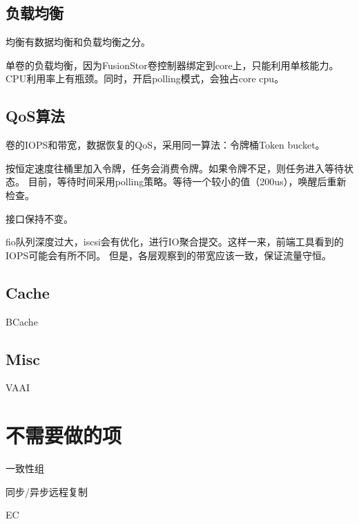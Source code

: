 \subsection{负载均衡}

均衡有数据均衡和负载均衡之分。

单卷的负载均衡，因为FusionStor卷控制器绑定到core上，只能利用单核能力。
CPU利用率上有瓶颈。同时，开启polling模式，会独占core cpu。

\subsection{QoS算法}

卷的IOPS和带宽，数据恢复的QoS，采用同一算法：令牌桶Token bucket。

按恒定速度往桶里加入令牌，任务会消费令牌。如果令牌不足，则任务进入等待状态。
目前，等待时间采用polling策略。等待一个较小的值（200us），唤醒后重新检查。

接口保持不变。

\begin{tcolorbox}
fio队列深度过大，iscsi会有优化，进行IO聚合提交。这样一来，前端工具看到的IOPS可能会有所不同。
但是，各层观察到的带宽应该一致，保证流量守恒。
\end{tcolorbox}

\subsection{Cache}

BCache

\subsection{Misc}

VAAI

\section{不需要做的项}

\begin{enumbox}
\item 一致性组
\item 同步/异步远程复制
\item EC
\end{enumbox}

